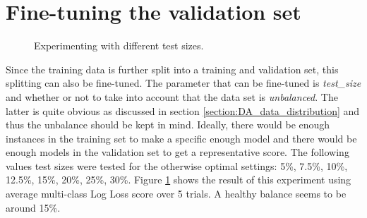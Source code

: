 
\section{Fine-tuning the validation set}
\label{section:LBM_finetuning_validation_set}

\begin{figure}
    \captionsetup{width=0.8\linewidth}
    \captionsetup{justification=centering}
    \caption{Experimenting with different test sizes.}
    \label{fig:2-LBM-test_size_sift}
\end{figure}

Since the training data is further split into a training and validation set, this splitting can also be fine-tuned.
The parameter that can be fine-tuned is \textit{test\_size} and whether or not to take into account that the data set is \textit{unbalanced}.
The latter is quite obvious as discussed in section \ref{section:DA_data_distribution} and thus the unbalance should be kept in mind.
Ideally, there would be enough instances in the training set to make a specific enough model and there would be enough models in the validation set to get a representative score. 
The following values test sizes were tested for the otherwise optimal settings: 5\%, 7.5\%, 10\%, 12.5\%, 15\%, 20\%, 25\%, 30\%.
Figure \ref{fig:2-LBM-test_size_sift} shows the result of this experiment using average multi-class Log Loss score over 5 trials.
A healthy balance seems to be around 15\%.




